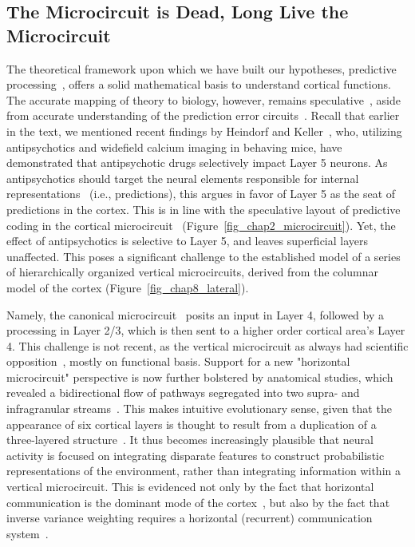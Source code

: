 \subsection{The Microcircuit is Dead, Long Live the Microcircuit}
The theoretical framework upon which we have built our hypotheses, predictive processing~\cite{rao1999predictive,friston2005theory}, offers a solid mathematical basis to understand cortical functions. The accurate mapping of theory to biology, however, remains speculative~\cite{bastos2012canonical,shipp2016neural}, aside from accurate understanding of the prediction error circuits~\cite{keller2012sensorimotor, keller2018predictive}. Recall that earlier in the text, we mentioned recent findings by Heindorf and Keller~\cite{heindorf2022reduction}, who, utilizing antipsychotics and widefield calcium imaging in behaving mice, have demonstrated that antipsychotic drugs selectively impact Layer 5 neurons. As antipsychotics should target the neural elements responsible for internal representations~\cite{friston2018does} (i.e., predictions), this argues in favor of Layer 5 as the seat of predictions in the cortex. This is in line with the speculative layout of predictive coding in the cortical microcircuit~\cite{bastos2012canonical} (Figure~\ref{fig_chap2_microcircuit}). Yet, the effect of antipsychotics is selective to Layer 5, and leaves superficial layers unaffected. This poses a significant challenge to the established model of a series of hierarchically organized vertical microcircuits, derived from the columnar model of the cortex (Figure~\ref{fig_chap8_lateral}).

Namely, the canonical microcircuit~\cite{martin1994brief} posits an input in Layer 4, followed by a processing in Layer 2/3, which is then sent to a higher order cortical area's Layer 4. This challenge is not recent, as the vertical microcircuit as always had scientific opposition~\cite{horton2005cortical}, mostly on functional basis. Support for a new "horizontal microcircuit" perspective is now further bolstered by anatomical studies, which revealed a bidirectional flow of pathways segregated into two supra- and infragranular streams~\cite{markov2014anatomy}. This makes intuitive evolutionary sense, given that the appearance of six cortical layers is thought to result from a duplication of a three-layered structure~\cite{shepherd2011microcircuit}. It thus becomes increasingly plausible that neural activity is focused on integrating disparate features to construct probabilistic representations of the environment, rather than integrating information within a vertical microcircuit. This is evidenced not only by the fact that horizontal communication is the dominant mode of the cortex~\cite{muller2018cortical}, but also by the fact that inverse variance weighting requires a horizontal (recurrent) communication system~\cite{ladret2023cortical}.

